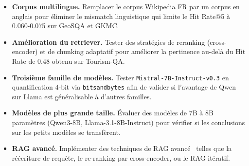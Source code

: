 \documentclass[12pt,a4paper]{article}
\begin{document}
\begin{itemize}[leftmargin=*]
  \item \textbf{Corpus multilingue.} Remplacer le corpus Wikipedia FR par un corpus en anglais pour \'eliminer le mismatch linguistique qui limite le Hit Rate@5 \`a 0.060-0.075 sur GeoSQA et GKMC.

  \item \textbf{Am\'elioration du retriever.} Tester des strat\'egies de reranking (cross-encoder) et de chunking adaptatif pour am\'eliorer la pertinence au-del\`a du Hit Rate de 0.48 obtenu sur Tourism-QA.

  \item \textbf{Troisi\`eme famille de mod\`eles.} Tester \texttt{Mistral-7B-Instruct-v0.3} en quantification 4-bit via \texttt{bitsandbytes} afin de valider si l'avantage de Qwen sur Llama est g\'en\'eralisable \`a d'autres familles.

  \item \textbf{Mod\`eles de plus grande taille.} \'Evaluer des mod\`eles de 7B \`a 8B param\`etres (Qwen3-8B, Llama-3.1-8B-Instruct) pour v\'erifier si les conclusions sur les petits mod\`eles se transf\`erent.

  \item \textbf{RAG avanc\'e.} Impl\'ementer des techniques de RAG avanc\'e~\cite{gao2023ragsurvey} telles que la r\'e\'ecriture de requ\^ete, le re-ranking par cross-encoder, ou le RAG it\'eratif.
\end{itemize}


\newpage


\end{document}
